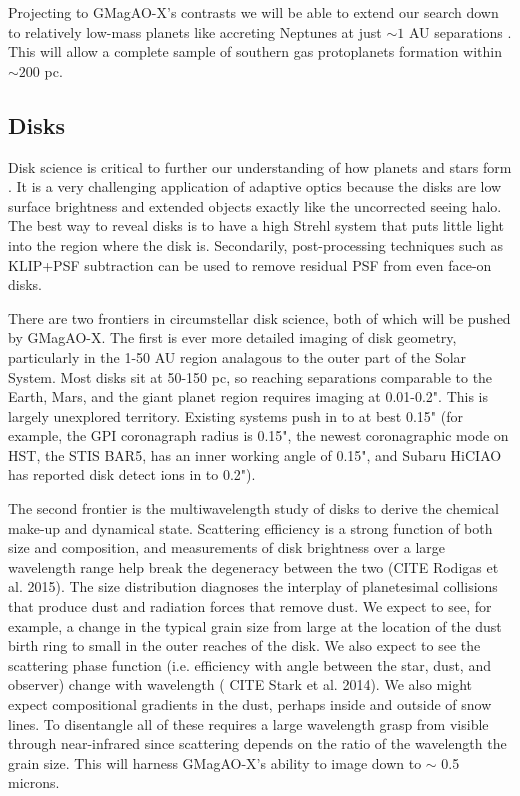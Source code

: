 \documentclass[12pt,preprint]{aastex}
\begin{document}
Projecting to  GMagAO-X's contrasts we will be able to extend our search down to relatively low-mass planets like accreting Neptunes at just $\sim1$ AU separations \citep{2019BAAS...51c.527S}. This will allow a complete sample of southern gas protoplanets formation within $\sim200$ pc. 







\subsection{ Disks }
Disk science is critical to further our understanding of how planets and stars form \citep[see Astro2020 science whitepapers:][]{2019BAAS...51c.346J, 2019BAAS...51c.445W, 2019BAAS...51c.566D}.
It is a very challenging application of adaptive optics because
the disks are low surface brightness and extended objects exactly like the
uncorrected seeing halo. The best way to reveal disks is to have a high Strehl
system that puts little light into the region where the disk is. Secondarily,
post-processing techniques such as KLIP+PSF subtraction can be used to remove
residual PSF from even face-on disks.

There are two frontiers in circumstellar disk science, both of which will be
pushed by GMagAO-X. The first is ever more detailed imaging of disk geometry,
particularly in the 1-50 AU region analagous to the outer part of the Solar
System. Most disks sit at 50-150 pc, so reaching separations comparable to the Earth, Mars, and the giant
planet region requires imaging at 0.01-0.2". This is largely unexplored
territory. Existing systems push in to at best 0.15" (for example, the GPI
coronagraph radius is 0.15", the newest coronagraphic mode on HST, the STIS
BAR5, has an inner working angle of 0.15", and Subaru HiCIAO has reported disk
detect ions in to 0.2").  

The second frontier is the multiwavelength study of disks to derive the
chemical make-up and dynamical state.  Scattering efficiency is a strong
function of both size and composition, and measurements of disk brightness
over a large wavelength range help break the degeneracy between the two
(CITE Rodigas et al. 2015). The size distribution diagnoses the interplay of
planetesimal collisions that produce dust and radiation forces that remove
dust. We expect to see, for example, a change in the typical grain size from
large at the location of the dust birth ring to small in the outer reaches of
the disk. We also expect to see the scattering phase function (i.e. efficiency
with angle between the star, dust, and observer) change with wavelength ( CITE Stark
et al. 2014). We also might expect compositional gradients in the dust,
perhaps inside and outside of snow lines. To disentangle all of these requires
a large wavelength grasp from visible through near-infrared since scattering
depends on the ratio of the wavelength the grain size. This will harness GMagAO-X's ability to
image down to $\sim$ 0.5 microns.
\end{document}
